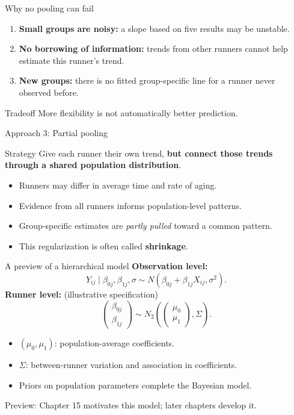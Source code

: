 \documentclass[aspectratio=43,11pt]{beamer}
\begin{document}
\begin{frame}{Why no pooling can fail}
\begin{enumerate}
\item \textbf{Small groups are noisy:} a slope based on five results may be unstable.
\item \textbf{No borrowing of information:} trends from other runners cannot help estimate this runner's trend.
\item \textbf{New groups:} there is no fitted group-specific line for a runner never observed before.
\end{enumerate}
\begin{block}{Tradeoff}
More flexibility is not automatically better prediction.
\end{block}
\end{frame}

\begin{frame}{Approach 3: Partial pooling}
\begin{block}{Strategy}
Give each runner their own trend, \textbf{but connect those trends through a shared population distribution}.
\end{block}
\begin{itemize}
\item Runners may differ in average time and rate of aging.
\item Evidence from all runners informs population-level patterns.
\item Group-specific estimates are \emph{partly pulled} toward a common pattern.
\item This regularization is often called \textbf{shrinkage}.
\end{itemize}
\end{frame}

\begin{frame}{A preview of a hierarchical model}
\textbf{Observation level:}
\[
Y_{ij}\mid\beta_{0j},\beta_{1j},\sigma\sim
N(\beta_{0j}+\beta_{1j}X_{ij},\sigma^2).
\]
\textbf{Runner level:} {\tiny (illustrative specification)}
\[
\begin{pmatrix}\beta_{0j}\\\beta_{1j}\end{pmatrix}
\sim N_2\!\left(\begin{pmatrix}\mu_0\\\mu_1\end{pmatrix},\Sigma\right).
\]
\begin{itemize}
\item \((\mu_0,\mu_1)\): population-average coefficients.
\item \(\Sigma\): between-runner variation and association in coefficients.
\item Priors on population parameters complete the Bayesian model.
\end{itemize}
{\scriptsize Preview: Chapter 15 motivates this model; later chapters develop it.}
\end{frame}
\end{document}
